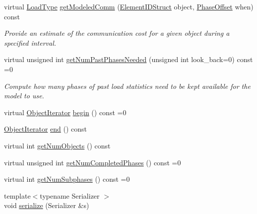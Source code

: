 \begin{DoxyCompactItemize}
virtual \hyperlink{namespacevt_a8fb51741340b87d7aaee0bef60e9896b}{Load\+Type} \hyperlink{structvt_1_1vrt_1_1collection_1_1balance_1_1_load_model_a47bd42bc5f25e43c62042caaa3fd05f7}{get\+Modeled\+Comm} (\hyperlink{namespacevt_1_1vrt_1_1collection_1_1balance_a9f5b53fafb270212279a4757d2c4cd28}{Element\+I\+D\+Struct} object, \hyperlink{structvt_1_1vrt_1_1collection_1_1balance_1_1_phase_offset}{Phase\+Offset} when) const
\begin{DoxyCompactList}\small\item\em Provide an estimate of the communication cost for a given object during a specified interval. \end{DoxyCompactList}\item 
virtual unsigned int \hyperlink{structvt_1_1vrt_1_1collection_1_1balance_1_1_load_model_a44905eb3e15e7f22b2f8d1fe7297cea0}{get\+Num\+Past\+Phases\+Needed} (unsigned int look\+\_\+back=0) const =0
\begin{DoxyCompactList}\small\item\em Compute how many phases of past load statistics need to be kept available for the model to use. \end{DoxyCompactList}\item 
virtual \hyperlink{structvt_1_1vrt_1_1collection_1_1balance_1_1_object_iterator}{Object\+Iterator} \hyperlink{structvt_1_1vrt_1_1collection_1_1balance_1_1_load_model_a085a13e3cfeff2beb88b49ddaed4ef8d}{begin} () const =0
\item 
\hyperlink{structvt_1_1vrt_1_1collection_1_1balance_1_1_object_iterator}{Object\+Iterator} \hyperlink{structvt_1_1vrt_1_1collection_1_1balance_1_1_load_model_a2b3212a8438a4b58a73c41db841f15b7}{end} () const
\item 
virtual int \hyperlink{structvt_1_1vrt_1_1collection_1_1balance_1_1_load_model_a438cd95f1c60b4232152335c4ee950bc}{get\+Num\+Objects} () const
\item 
virtual unsigned int \hyperlink{structvt_1_1vrt_1_1collection_1_1balance_1_1_load_model_abba98976118ff797fc2393a50e3e80d8}{get\+Num\+Completed\+Phases} () const =0
\item 
virtual int \hyperlink{structvt_1_1vrt_1_1collection_1_1balance_1_1_load_model_aa7ddeca4fc8de99bc25a895e207de2e6}{get\+Num\+Subphases} () const =0
\item 
{\footnotesize template$<$typename Serializer $>$ }\\void \hyperlink{structvt_1_1vrt_1_1collection_1_1balance_1_1_load_model_a52e2210225947697a235b75c385eb104}{serialize} (Serializer \&s)
\end{DoxyCompactItemize}


